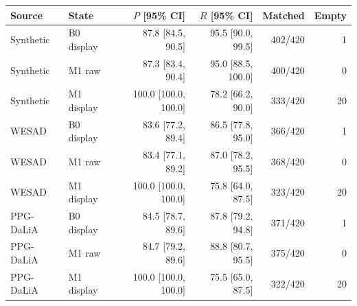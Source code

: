 \begin{tabular}{llrrrr}
\toprule
Source & State & $P$ [95\% CI] & $R$ [95\% CI] & Matched & Empty \\
\midrule
Synthetic & B0 display & 87.8 [84.5, 90.5] & 95.5 [90.0, 99.5] & 402/420 & 1 \\
Synthetic & M1 raw & 87.3 [83.4, 90.4] & 95.0 [88.5, 100.0] & 400/420 & 0 \\
Synthetic & M1 display & 100.0 [100.0, 100.0] & 78.2 [66.2, 90.0] & 333/420 & 20 \\
WESAD & B0 display & 83.6 [77.2, 89.4] & 86.5 [77.8, 95.0] & 366/420 & 1 \\
WESAD & M1 raw & 83.4 [77.1, 89.2] & 87.0 [78.2, 95.5] & 368/420 & 0 \\
WESAD & M1 display & 100.0 [100.0, 100.0] & 75.8 [64.0, 87.5] & 323/420 & 20 \\
PPG-DaLiA & B0 display & 84.5 [78.7, 89.6] & 87.8 [79.2, 94.8] & 371/420 & 1 \\
PPG-DaLiA & M1 raw & 84.7 [79.2, 89.6] & 88.8 [80.7, 95.5] & 375/420 & 0 \\
PPG-DaLiA & M1 display & 100.0 [100.0, 100.0] & 75.5 [65.0, 87.5] & 322/420 & 20 \\
\bottomrule
\end{tabular}
